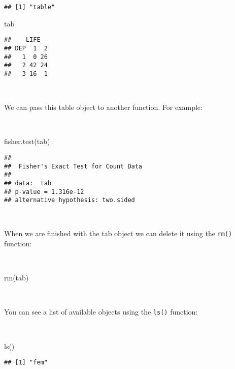 \documentclass[
  12pt,
  a4paper]{book}
\newenvironment{Shaded}{\begin{snugshade}}{\end{snugshade}}
\newcommand{\FunctionTok}[1]{\textcolor[rgb]{0.00,0.00,0.00}{#1}}
\newcommand{\NormalTok}[1]{#1}
\begin{document}
\begin{verbatim}
## [1] "table"
\end{verbatim}

\begin{Shaded}
\begin{Highlighting}[]
\NormalTok{tab}
\end{Highlighting}
\end{Shaded}

\begin{verbatim}
##    LIFE
## DEP  1  2
##   1  0 26
##   2 42 24
##   3 16  1
\end{verbatim}

~

We can pass this table object to another function. For example:

~

\begin{Shaded}
\begin{Highlighting}[]
\FunctionTok{fisher.test}\NormalTok{(tab)}
\end{Highlighting}
\end{Shaded}

\begin{verbatim}
## 
##  Fisher's Exact Test for Count Data
## 
## data:  tab
## p-value = 1.316e-12
## alternative hypothesis: two.sided
\end{verbatim}

~

When we are finished with the tab object we can delete it using the \texttt{rm()} function:

~

\begin{Shaded}
\begin{Highlighting}[]
\FunctionTok{rm}\NormalTok{(tab)}
\end{Highlighting}
\end{Shaded}

~

You can see a list of available objects using the \texttt{ls()} function:

~

\begin{Shaded}
\begin{Highlighting}[]
\FunctionTok{ls}\NormalTok{()}
\end{Highlighting}
\end{Shaded}

\begin{verbatim}
## [1] "fem"
\end{verbatim}
\end{document}
